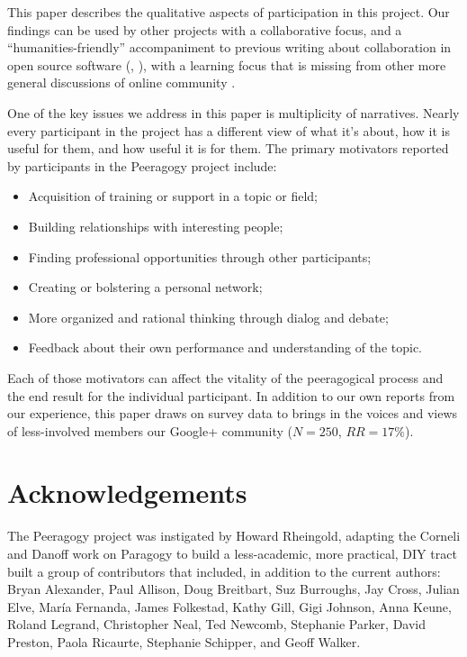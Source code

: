 \documentclass{acm_proc_article-sp}
\begin{document}
This paper describes the qualitative aspects of participation in this
project.  Our findings can be used by other projects with a
collaborative focus, and a ``humanities-friendly'' accompaniment to
previous writing about collaboration in open source software
(\cite{OpenAdvice}, \cite{crowstonXdefiningX2003}), with a learning
focus that is missing from other more general discussions of online
community \cite{bacon2012art}.

One of the key issues we address in this paper is multiplicity of
narratives.  Nearly every participant in the project has a different
view of what it's about, how it is useful for them, and how useful it
is for them.  The primary motivators reported by participants in the
Peeragogy project include:
\begin{itemize}
\item Acquisition of training or support in a topic or field;
\item Building relationships with interesting people;
\item Finding professional opportunities through other participants;
\item Creating or bolstering a personal network;
\item More organized and rational thinking through dialog and debate;
\item Feedback about their own performance and understanding of the
  topic.
\end{itemize}

Each of those motivators can affect the vitality of the peeragogical
process and the end result for the individual participant.  In
addition to our own reports from our experience, this paper draws on
survey data to brings in the voices and views of less-involved members
our Google+ community ($N=250$, $RR=17\%$).

\section{Acknowledgements}

The Peeragogy project was instigated by Howard Rheingold, adapting the
Corneli and Danoff \cite{paragogy} work on Paragogy to build a
less-academic, more practical, DIY tract built a group of contributors
that included, in addition to the current authors: Bryan Alexander,
Paul Allison, Doug Breitbart, Suz Burroughs, Jay Cross, Julian Elve,
Mar\'ia Fernanda, James Folkestad, Kathy Gill, Gigi Johnson, Anna
Keune, Roland Legrand, Christopher Neal, Ted Newcomb, Stephanie
Parker, David Preston, Paola Ricaurte, Stephanie Schipper, and Geoff
Walker.
\end{document}
